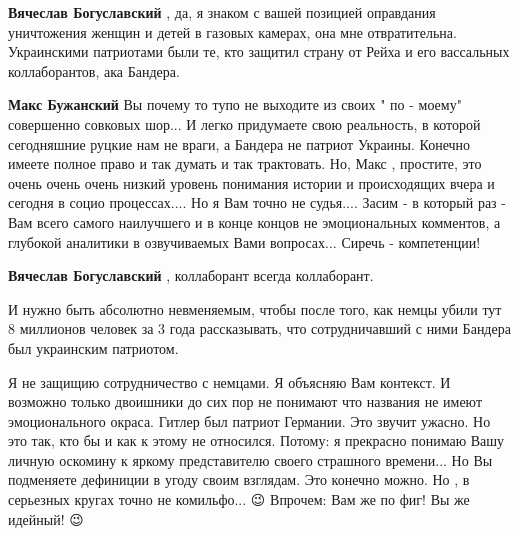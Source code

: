 \begin{itemize}
\begin{itemize}
 
\textbf{Вячеслав Богуславский} , да, я знаком с вашей позицией оправдания
уничтожения женщин и детей в газовых камерах, она мне отвратительна.
Украинскими патриотами были те, кто защитил страну от Рейха и его вассальных
коллаборантов, ака Бандера.

 
\textbf{Макс Бужанский} Вы почему то тупо не выходите из своих " по - моему"
совершенно совковых шор... И легко придумаете свою реальность, в которой
сегодняшние руцкие нам не враги, а Бандера не патриот Украины. Конечно имеете
полное право и так думать и так трактовать. Но, Макс , простите, это очень
очень очень низкий уровень понимания истории и происходящих вчера и сегодня в
социо процессах.... Но я Вам точно не судья.... \Smiley[1.0][yellow] Засим - в который раз - Вам
всего самого наилучшего и в конце концов не эмоциональных комментов, а глубокой
аналитики в озвучиваемых Вами вопросах... Сиречь - компетенции! \Smiley[1.0][yellow]

 
\textbf{Вячеслав Богуславский} , коллаборант всегда коллаборант.

И нужно быть абсолютно невменяемым, чтобы после того, как немцы убили тут 8
миллионов человек за 3 года рассказывать, что сотрудничавший с ними Бандера был
украинским патриотом.

 

Я не защищию сотрудничество с немцами. Я объясняю Вам контекст. И возможно
только двоишники до сих пор не понимают что названия не имеют эмоционального
окраса. Гитлер был патриот Германии. Это звучит ужасно. Но это так, кто бы и
как к этому не относился. Потому: я прекрасно понимаю Вашу личную оскомину к
яркому представителю своего страшного времени... Но Вы подменяете дефиниции в
угоду своим взглядам. Это конечно можно. Но , в серьезных кругах точно не
комильфо... 😉 Впрочем: Вам же по фиг! Вы же идейный! 😉



\end{itemize}
\end{itemize}
